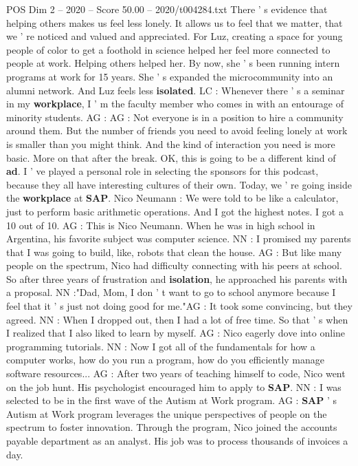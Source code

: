 \begin{textsample}{POS Dim 2 – 2020 – Score 50.00 – 2020/t004284.txt}
There ' s evidence that helping others makes us feel less lonely.
It allows us to feel that we matter, that we ' re noticed and valued and appreciated.
For Luz, creating a space for young people of color to get a foothold in science helped her feel more connected to people at work.
Helping others helped her.
By now, she ' s been running intern programs at work for 15 years.
She ' s expanded the microcommunity into an alumni network.
And Luz feels less \textbf{isolated}.
LC : Whenever there ' s a seminar in my \textbf{workplace}, I ' m the faculty member who comes in with an entourage of minority students.
AG : AG : Not everyone is in a position to hire a community around them.
But the number of friends you need to avoid feeling lonely at work is smaller than you might think.
And the kind of interaction you need is more basic.
More on that after the break.
OK, this is going to be a different kind of \textbf{ad}.
I ' ve played a personal role in selecting the sponsors for this podcast, because they all have interesting cultures of their own.
Today, we ' re going inside the \textbf{workplace} at \textbf{SAP}.
Nico Neumann : We were told to be like a calculator, just to perform basic arithmetic operations.
And I got the highest notes.
I got a 10 out of 10.
AG : This is Nico Neumann.
When he was in high school in Argentina, his favorite subject was computer science.
NN : I promised my parents that I was going to build, like, robots that clean the house.
AG : But like many people on the spectrum, Nico had difficulty connecting with his peers at school.
So after three years of frustration and \textbf{isolation}, he approached his parents with a proposal.
NN :"Dad, Mom, I don ' t want to go to school anymore because I feel that it ' s just not doing good for me."AG : It took some convincing, but they agreed.
NN : When I dropped out, then I had a lot of free time.
So that ' s when I realized that I also liked to learn by myself.
AG : Nico eagerly dove into online programming tutorials.
NN : Now I got all of the fundamentals for how a computer works, how do you run a program, how do you efficiently manage software resources...
AG : After two years of teaching himself to code, Nico went on the job hunt.
His psychologist encouraged him to apply to \textbf{SAP}.
NN : I was selected to be in the first wave of the Autism at Work program.
AG : \textbf{SAP} ' s Autism at Work program leverages the unique perspectives of people on the spectrum to foster innovation.
Through the program, Nico joined the accounts payable department as an analyst.
His job was to process thousands of invoices a day.

\end{textsample}
